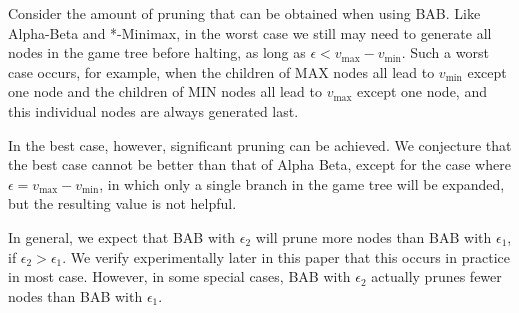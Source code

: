 \documentclass[runningheads]{llncs}
\newcommand{\vmax}{v_{\text{max}}}
\newcommand{\vmin}{v_{\text{min}}}
\begin{document}
Consider the amount of pruning that can be obtained when using BAB. Like Alpha-Beta and *-Minimax, in the worst case we still may need to generate all nodes in the game tree before halting, as long as $\epsilon<\vmax-\vmin$. 
Such a worst case occurs, for example, when the children of MAX nodes all lead to $\vmin$ except one node
and the children of MIN nodes all lead to $\vmax$ except one node, and this individual nodes are always generated last. 

In the best case, however, significant pruning can be achieved.
We conjecture that the best case cannot be better than that of Alpha Beta, except for the case where $\epsilon=\vmax-\vmin$, in which only a single branch in the game tree will be expanded, but the resulting value is not helpful. 


In general, we expect that  BAB with  $\epsilon_2$ will prune more nodes than BAB with $\epsilon_1$, if $\epsilon_2 > \epsilon_1$.
We verify experimentally later in this paper that this occurs in practice in most case.
However, in some special cases, BAB with $\epsilon_2$ actually prunes fewer nodes than BAB with $\epsilon_1$. 
\end{document}
